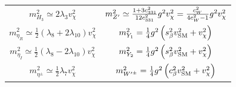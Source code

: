 \begin{center}
\begin{small}
\begin{tabular}{|c | c|}
 $m_{H_3}^2 \simeq 2\lambda_3 v_\chi^2$ &   $m_{Z'}^2 \simeq \frac{1+3c_{\rm 331}^2}{12c_{\rm 331}^2}g^2 v_\chi^2 = \frac{c_W^2}{4c_W^2 -1}g^2 v_\chi^2$   \\[10pt] 
$m_{\eta_R}^2 \simeq \frac{1}{2} \left( \lambda_8+2 \lambda_{10} \right) v_\chi^2$  & $m_{Y_1}^2 =\frac{1}{4}g^2\left( s_\beta^2 v_{\rm SM}^2 + v_\chi^2 \right)$   \\[10pt]   
  $m_{\eta_I}^2 \simeq \frac{1}{2} \left( \lambda_8 - 2 \lambda_{10} \right) v_\chi^2 $ &  $m_{Y_2}^2 =\frac{1}{4}g^2\left( s_\beta^2 v_{\rm SM}^2 + v_\chi^2 \right)$   \\[10pt]   
 $m_{\eta^{\pm}}^2 \simeq \frac{1}{2}\lambda_7 v_\chi^2$  &  $m_{W'^{\pm}}^2 = \frac{1}{4} g^2 \left( c_{\beta}^2 v_{\rm SM}^2 + v_\chi^2  \right) $ \\
 \hline
\end{tabular}
\end{small}
\label{masses331}
\end{center}


